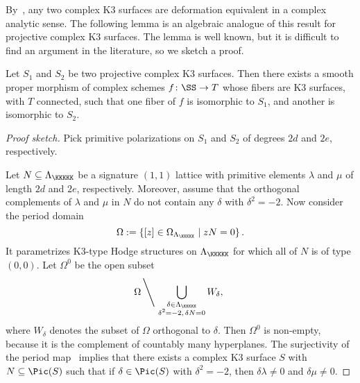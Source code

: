 By~\cite[Theorem~7.1.1]{HuybrechtsK3}, any two complex K3 surfaces are deformation equivalent in a complex analytic sense. The following lemma is an algebraic analogue of this result for projective complex K3 surfaces. The lemma is well known, but it is difficult to find an argument in the literature, so we sketch a proof.
\begin{lemma}\label{lem:k3_defo_equiv}
Let $S_1$ and $S_2$ be two projective complex K3 surfaces. Then there exists a smooth proper morphism of complex schemes $f\colon \SS \rightarrow T$ whose fibers are K3 surfaces, with $T$ connected, such that one fiber of $f$ is isomorphic to $S_1$, and another is isomorphic to $S_2$.
\end{lemma}
\begin{proof}[Proof sketch]
Pick primitive polarizations on $S_1$ and $S_2$ of degrees $2d$ and $2e$, respectively. 


    Let $N \subseteq \Lambda_{\KKKKK}$ be a signature $(1,1)$ lattice with primitive elements $\lambda$ and $\mu$ of length $2d$ and $2e$, respectively. Moreover, assume that the orthogonal complements of $\lambda$ and $\mu$ in $N$ do not contain any $\delta$ with $\delta^2 = -2$. Now consider the period domain
$$
\Omega := \left\{ [z] \in \Omega_{\Lambda_{\KKKKK}} \mid z N = 0\right\}.
$$
It parametrizes K3-type Hodge structures on $\Lambda_{\KKKKK}$ for which all of $N$ is of type $(0,0)$. Let $\Omega^0$ be the open subset
$$
    \Omega \left\backslash \ \bigcup_{\substack{\delta \in \Lambda_{\KKKKK} \\ \delta^2 = -2, \, \delta N = 0}} W_{\delta},\right.
$$
    where $W_{\delta}$ denotes the subset of $\Omega$ orthogonal to $\delta$. Then $\Omega^0$ is non-empty, because it is the complement of countably many hyperplanes. The surjectivity of the period map~\cite[Theorem~6.3.1]{HuybrechtsK3} implies that there exists a complex K3 surface $S$ with $N \subseteq \Pic(S)$ such that if $\delta \in \Pic(S)$ with $\delta^2 = -2$, then $\delta \lambda \neq 0$ and $\delta \mu \neq 0$.


\end{proof}
